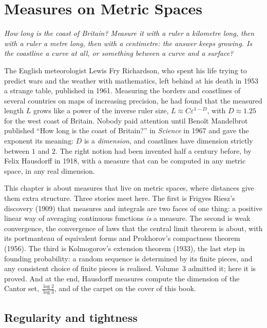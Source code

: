 \chapter{Measures on Metric Spaces}

\begin{center}\itshape
How long is the coast of Britain? Measure it with a ruler a kilometre long, then with a ruler a metre long, then with a
centimetre: the answer keeps growing. Is the coastline a curve at all, or something between a curve and a surface?
\end{center}

The English meteorologist Lewis Fry Richardson, who spent his life trying to predict wars and the weather with
mathematics, left behind at his death in 1953 a strange table, published in 1961. Measuring the borders and coastlines of several countries on maps of increasing
precision, he had found that the measured length $L$ grows like a power of the inverse ruler size, $L\approx C\varepsilon^{1-D}$, with
$D\approx1.25$ for the west coast of Britain. Nobody paid attention until Beno\^it Mandelbrot published ``How long is the coast of
Britain?'' in \emph{Science} in 1967 and gave the exponent its meaning: $D$ is a \emph{dimension}, and coastlines have dimension
strictly between $1$ and $2$. The right notion had been invented half a century before, by Felix Hausdorff in 1918, with a measure
that can be computed in any metric space, in any real dimension.

This chapter is about measures that live on metric spaces, where distances give them extra structure. Three stories meet
here. The first is Frigyes Riesz's discovery (1909) that measures and integrals are two faces of one thing: a positive linear way of
averaging continuous functions \emph{is} a measure. The second is weak convergence, the convergence of laws that the central
limit theorem is about, with its portmanteau of equivalent forms and Prokhorov's compactness theorem (1956). The third is
Kolmogorov's extension theorem (1933), the last step in founding probability: a random sequence is determined by its finite
pieces, and any consistent choice of finite pieces is realised. Volume~3 admitted it; here it is proved. And at the end, Hausdorff
measures compute the dimension of the Cantor set, $\frac{\log2}{\log3}$, and of the carpet on the cover of this book.

\section{Regularity and tightness}

